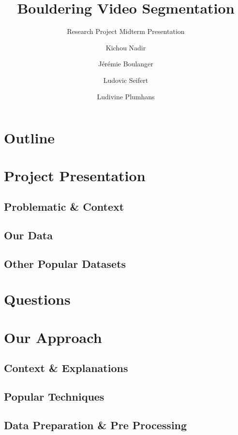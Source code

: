 \documentclass[aspectratio=169]{beamer}
\title{Bouldering Video Segmentation}
\subtitle{Research Project Midterm Presentation}
\author{Kichou Nadir \\ \and Jérémie Boulanger \and Ludovic Seifert \and Ludivine Plumhans}
\institute{CRIStAL, SIGMA \& Univ de Rouen}
\date{}
\begin{document}


\section*{Outline}


\section{Project Presentation}

\subsection{Problematic \& Context}


\subsection{Our Data}

\subsection{Other Popular Datasets}



\section{Questions}


\section{Our Approach}
\subsection{Context \& Explanations}


\subsection{Popular Techniques}


\subsection{Data Preparation \& Pre Processing}

\end{document}

